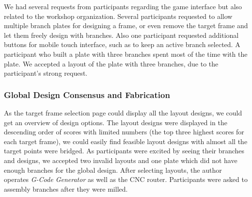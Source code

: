 We had several requests from participants regarding the game interface but also related to the workshop organization. 
Several participants requested to allow multiple branch plates for designing a frame, or even remove the target frame and let them freely design with branches.
Also one participant requested additional buttons for mobile touch interface, such as to keep an active branch selected.
A participant who built a plate with three branches spent most of the time with the plate. 
We accepted a layout of the plate with three branches, due to the participant's strong request.


\subsubsection*{Global Design Consensus and Fabrication} 
As the target frame selection page could display all the layout designs, we could get an overview of design options.
The layout designs were displayed in the descending order of scores with limited numbers (the top three highest scores for each target frame), we could easily find feasible layout designs with almost all the target points were bridged.
As participants were excited by seeing their branches and designs, we accepted two invalid layouts and one plate which did not have enough branches for the global design.
%
After selecting layouts, the author operates \textit{G-Code Generator} as well as the CNC router.
Participants were asked to assembly branches after they were milled.

